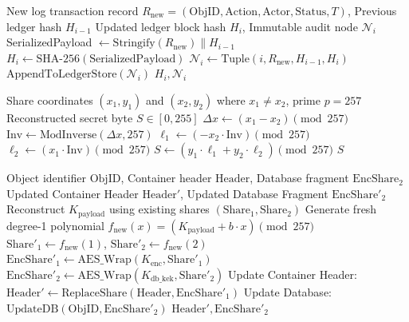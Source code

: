 \documentclass[sn-mathphys,Numbered]{sn-jnl}%
\theoremstyle{thmstyleone}%
\theoremstyle{thmstyletwo}%
\theoremstyle{thmstylethree}%
\begin{document}
\begin{algorithm}[!htbp]
\caption{Cryptographic Hash-Chain Append and Forensic Auditing}
\label{alg:hashchain}
\begin{algorithmic}[1]
\Require New log transaction record $R_{\text{new}} = (\text{ObjID}, \text{Action}, \text{Actor}, \text{Status}, T)$, Previous ledger hash $H_{i-1}$
\Ensure Updated ledger block hash $H_i$, Immutable audit node $\mathcal{N}_i$
\State SerializedPayload $\gets \text{Stringify}(R_{\text{new}}) \parallel H_{i-1}$
\State $H_i \gets \text{SHA-256}(\text{SerializedPayload})$
\State $\mathcal{N}_i \gets \text{Tuple}(i, R_{\text{new}}, H_{i-1}, H_i)$
\State $\text{AppendToLedgerStore}(\mathcal{N}_i)$
\State \Return $H_i, \mathcal{N}_i$
\end{algorithmic}
\end{algorithm}

\begin{algorithm}[!htbp]
\caption{Finite Field Lagrange Reconstruction over $\text{GF}(257)$}
\label{alg:lagrange}
\begin{algorithmic}[1]
\Require Share coordinates $(x_1, y_1)$ and $(x_2, y_2)$ where $x_1 \neq x_2$, prime $p=257$
\Ensure Reconstructed secret byte $S \in [0, 255]$
\State $\Delta x \gets (x_1 - x_2) \pmod{257}$
\State $\text{Inv} \gets \text{ModInverse}(\Delta x, 257)$ 
\State $\ell_1 \gets (-x_2 \cdot \text{Inv}) \pmod{257}$
\State $\ell_2 \gets (x_1 \cdot \text{Inv}) \pmod{257}$
\State $S \gets (y_1 \cdot \ell_1 + y_2 \cdot \ell_2) \pmod{257}$
\State \Return $S$
\end{algorithmic}
\end{algorithm}

\begin{algorithm}[!htbp]
\caption{Zero-Trust Key Rotation and Multi-Domain Re-encryption}
\label{alg:rotation}
\begin{algorithmic}[1]
\Require Object identifier $\text{ObjID}$, Container header $\text{Header}$, Database fragment $\text{EncShare}_2$
\Ensure Updated Container Header $\text{Header}'$, Updated Database Fragment $\text{EncShare}'_2$
\State Reconstruct $K_{\text{payload}}$ using existing shares $(\text{Share}_1, \text{Share}_2)$
\State Generate fresh degree-1 polynomial $f_{\text{new}}(x) = (K_{\text{payload}} + b \cdot x) \pmod{257}$
\State $\text{Share}'_1 \gets f_{\text{new}}(1)$, $\text{Share}'_2 \gets f_{\text{new}}(2)$
\State $\text{EncShare}'_1 \gets \text{AES\_Wrap}(K_{\text{enc}}, \text{Share}'_1)$
\State $\text{EncShare}'_2 \gets \text{AES\_Wrap}(K_{\text{db\_kek}}, \text{Share}'_2)$
\State Update Container Header: $\text{Header}' \gets \text{ReplaceShare}(\text{Header}, \text{EncShare}'_1)$
\State Update Database: $\text{UpdateDB}(\text{ObjID}, \text{EncShare}'_2)$
\State \Return $\text{Header}', \text{EncShare}'_2$
\end{algorithmic}
\end{algorithm}
\end{document}
